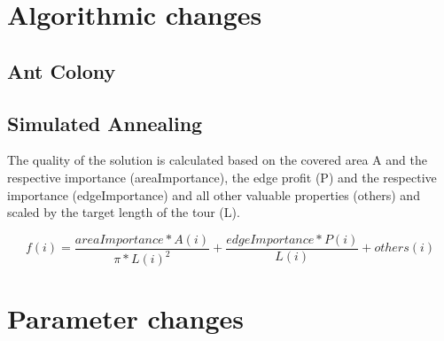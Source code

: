 \section{Algorithmic changes}
\label{sec:algorithmicChanges}

\subsection{Ant Colony}
\label{subsec:antColonyImplementation}


\subsection{Simulated Annealing}
\label{subsec:simulatedAnnealingImplementation}




The quality of the solution is calculated based on the covered area A and the respective importance (areaImportance), the edge profit (P) and the respective importance (edgeImportance) and all other valuable properties (others) and scaled by the target length of the tour (L). 

\begin{equation}\label{eq:qualitySA}
	f(i) = \frac{areaImportance * A(i)}{\pi * L(i)^2} + \frac{edgeImportance * P(i)}{L(i)} + others(i)
\end{equation}


\section{Parameter changes}
\label{sec:parameterChanges}

